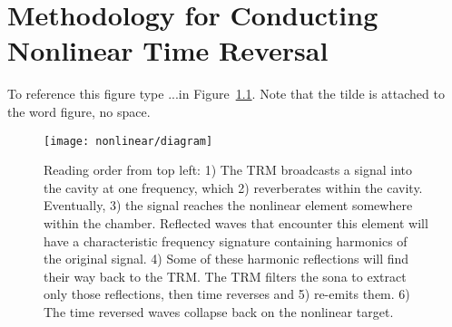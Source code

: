 \chapter{Methodology for Conducting Nonlinear Time Reversal}
\label{ch:nonlinear-meth}

To reference this figure type ...in Figure~\ref{fig:nonlinear-diagram}. Note that the tilde is attached to the word figure, no space.

\begin{figure}[h!]
\centering
\texttt{[image: nonlinear/diagram]}
    \caption[Demonstration of nonlinear time reversal]{Reading order from top left: 1) The TRM broadcasts a signal into the cavity at one frequency, which 2) reverberates within the cavity. Eventually, 3) the signal reaches the nonlinear element somewhere within the chamber. Reflected waves that encounter this element will have a characteristic frequency signature containing harmonics of the original signal. 4) Some of these harmonic reflections will find their way back to the TRM. The TRM filters the sona to extract only those reflections, then time reverses and 5) re-emits them. 6) The time reversed waves collapse back on the nonlinear target.}
    \label{fig:nonlinear-diagram}
\end{figure}